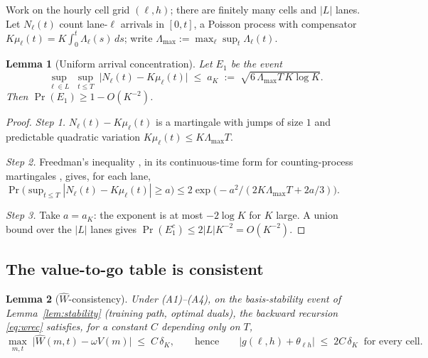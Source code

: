 \documentclass[11pt]{article}
\newtheorem{lemma}{Lemma}
\begin{document}
Work on the hourly cell grid $(\ell, h)$; there are finitely many
cells and $|L|$ lanes. Let $N_{\ell}(t)$ count lane-$\ell$
arrivals in $[0, t]$, a Poisson process with compensator
$K \mu_{\ell}(t) = K \int_0^t \Lambda_{\ell}(s)\, ds$; write
$\Lambda_{\max} := \max_{\ell} \sup_{t} \Lambda_{\ell}(t)$.

\begin{lemma}[Uniform arrival concentration]
\label{lem:conc}
Let $E_1$ be the event
\begin{equation}
  \sup_{\ell \in L}\; \sup_{t \leq T}\;
  \bigl| N_{\ell}(t) - K \mu_{\ell}(t) \bigr|
  \;\leq\; a_K \;:=\; \sqrt{6\, \Lambda_{\max} T\, K \log K}.
\end{equation}
Then $\Pr(E_1) \geq 1 - O(K^{-2})$.
\end{lemma}

\begin{proof}
\emph{Step 1.} $N_{\ell}(t) - K\mu_{\ell}(t)$ is a martingale with
jumps of size $1$ and predictable quadratic variation
$K\mu_{\ell}(t) \leq K \Lambda_{\max} T$.

\emph{Step 2.} Freedman's inequality
\citep{freedman1975tail}, in its continuous-time form for
counting-process martingales \citep{vandegeer1995exponential}, gives,
for each lane,
$\Pr\bigl(\sup_{t \leq T} |N_{\ell}(t) - K\mu_{\ell}(t)| \geq a\bigr)
\leq 2 \exp\bigl( -a^2 / (2 K \Lambda_{\max} T + 2a/3) \bigr)$.

\emph{Step 3.} Take $a = a_K$: the exponent is at most $-2 \log K$ for
$K$ large. A union bound over the $|L|$ lanes gives
$\Pr(E_1^c) \leq 2 |L| K^{-2} = O(K^{-2})$.
\end{proof}

\subsection{The value-to-go table is consistent}

\begin{lemma}[$\widehat{W}$-consistency]
\label{lem:wcons}
Under (A1)--(A4), on the basis-stability event of
Lemma~\ref{lem:stability} (training path, optimal duals), the backward
recursion \eqref{eq:wrec} satisfies, for a constant $C$ depending only
on $T$,
\begin{equation}
  \max_{m, t}\; \bigl| \widehat{W}(m, t) - \omega V(m) \bigr|
  \;\leq\; C\,\delta_K,
  \qquad\text{hence}\qquad
  \bigl| g(\ell, h) + \theta_{\ell h} \bigr| \;\leq\; 2 C\,\delta_K
  \;\;\text{for every cell.}
\end{equation}
\end{lemma}
\end{document}
